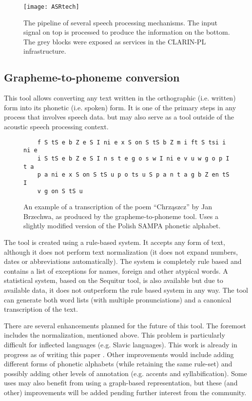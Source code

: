 \documentclass[a4paper,11pt]{article}
\begin{document}
\begin{figure}
    \centering
    \texttt{[image: ASRtech]}
    \caption{The pipeline of several speech processing mechanisms. The input signal on top is processed to produce the information on the bottom. The grey blocks were exposed as services in the CLARIN-PL infrastructure.}
    \label{fig:ASRtech}
\end{figure}

\subsection{Grapheme-to-phoneme conversion}

This tool allows converting any text written in the orthographic (i.e. written) form into its phonetic (i.e. spoken) form. It is one of the primary steps in any process that involves speech data. but may also serve as a tool outside of the acoustic speech processing context.

\begin{figure}
    \centering
    \begin{verbatim}
    f S tS e b Z e S I ni e x S on S tS b Z m i ft S tsi i ni e 
    i S tS e b Z e S I n s t e g o s w I ni e v u w g o p I t a 
    p a ni e x S on S tS u p o ts u S p a n t a g b Z en tS I 
    v g on S tS u
    \end{verbatim}
    \caption{An example of a transcription of the poem ``Chrz\k{a}szcz'' by Jan Brzechwa, as produced by the grapheme-to-phoneme tool. Uses a slightly modified version of the Polish SAMPA phonetic alphabet.}
    \label{fig:g2p}
\end{figure}

The tool is created using a rule-based system. It accepts any form of text, although it does not perform text normalization (it does not expand numbers, dates or abbreviations automatically). The system is completely rule based and contains a list of exceptions for names, foreign and other atypical words. A statistical system, based on the Sequitur \cite{bisani2008joint} tool, is also available but due to available data, it does not outperform the rule based system in any way. The tool can generate both word lists (with multiple pronunciations) and a canonical transcription of the text.

There are several enhancements planned for the future of this tool. The foremost includes the normalization, mentioned above. This problem is particularly difficult for inflected languages (e.g. Slavic languages). This work is already in progress as of writing this paper \cite{brocki2012multiple}. Other improvements would include adding different forms of phonetic alphabets (while retaining the same rule-set) and possibly adding other levels of annotation (e.g. accents and syllabification). Some uses may also benefit from using a graph-based representation, but these (and other) improvements will be added pending further interest from the community.
\end{document}
